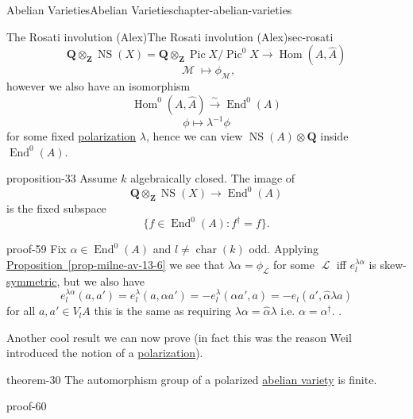 \documentclass[oneside,10pt,]{book}
\numberwithin{equation}{section}
\newcommand{\sheaf}[1]{\operatorname{\mathcal{#1}}}
\newcommand{\inv}{^{-1}}
\newcommand{\ZZ}{\mathbf{Z}}
\newcommand{\QQ}{\mathbf{Q}}
\DeclareMathOperator{\End}{End}
\DeclareMathOperator{\Hom}{Hom}
\DeclareMathOperator{\Pic}{Pic}
\DeclareMathOperator{\characteristic}{char}
\DeclareMathOperator{\NS}{NS}
\begin{document}
\begin{chapterptx}{Abelian Varieties}{}{Abelian Varieties}{}{}{chapter-abelian-varieties}
\begin{sectionptx}{The Rosati involution (Alex)}{}{The Rosati involution (Alex)}{}{}{sec-rosati}
\begin{equation*}
\QQ \otimes_\ZZ \NS(X) = \QQ \otimes_\ZZ \Pic X/\Pic^0 X \to \Hom(A, \hat A)
\end{equation*}
%
\begin{equation*}
\sheaf M \mapsto \phi_{\sheaf M}\text{,}
\end{equation*}
however we also have an isomorphism%
\begin{equation*}
\Hom^0(A, \hat A) \xrightarrow{\sim} \End^0(A)
\end{equation*}
%
\begin{equation*}
\phi \mapsto \lambda\inv \phi
\end{equation*}
for some fixed \hyperref[def-c-pol]{polarization} \(\lambda\), hence we can view \(\NS(A)\otimes \QQ\) inside \(\End^0(A)\).%
\begin{proposition}{}{}{proposition-33}%
\hypertarget{p-351}{}%
Assume \(k\) algebraically closed. The image of%
\begin{equation*}
\QQ \otimes_\ZZ \NS(X) \to \End^0(A)
\end{equation*}
is the fixed subspace%
\begin{equation*}
\{f \in \End^0(A) : f^\dagger = f\}\text{.}
\end{equation*}
%
\end{proposition}
\begin{proofptx}{}{proof-59}
\hypertarget{p-352}{}%
Fix \(\alpha \in \End^0(A)\) and \(l\ne \characteristic(k)\) odd. Applying \hyperref[prop-milne-av-13-6]{Proposition~\ref{prop-milne-av-13-6}} we see that \(\lambda \alpha = \phi_{\sheaf L}\) for some \(\sheaf L\) iff \(e^{\lambda\alpha}_l\) is skew-\hyperref[def-princ-pol]{symmetric}, but we also have%
\begin{equation*}
e_l^{\lambda\alpha}(a,a')=  e_l^{\lambda}(a,\alpha a') = -e_l^\lambda(\alpha a',a) = -e_l(a', \hat\alpha \lambda a)
\end{equation*}
for all \(a,a' \in V_lA\) this is the same as requiring \(\lambda\alpha = \hat \alpha \lambda\) i.e. \(\alpha = \alpha^\dagger\). .%
\end{proofptx}
\hypertarget{p-353}{}%
Another cool result we can now prove (in fact this was the reason Weil introduced the notion of a \hyperref[def-c-pol]{polarization}).%
\begin{theorem}{}{}{theorem-30}%
\hypertarget{p-354}{}%
The automorphism group of a polarized \hyperref[def-buntes-abvar]{abelian variety} is finite.%
\end{theorem}
\begin{proofptx}{}{proof-60}
\hypertarget{p-355}{}%

\end{proofptx}
\end{sectionptx}
\end{chapterptx}
\end{document}
